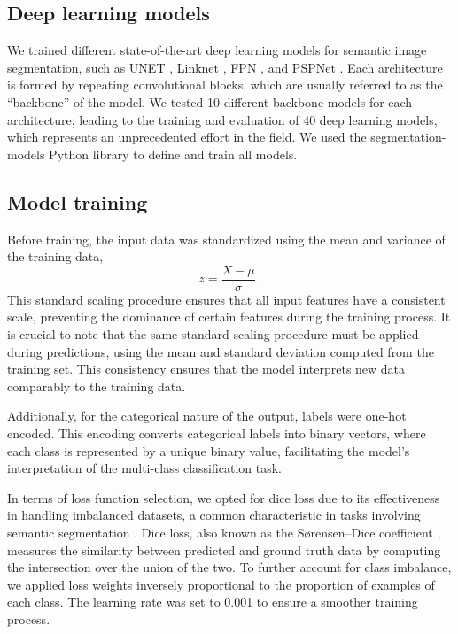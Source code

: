 \subsection{Deep learning models}

We trained different state-of-the-art deep learning models for semantic image
segmentation, such as UNET \cite{Ronneberger2015}, Linknet
\cite{Chaurasia2017}, FPN \cite{Lin2017}, and PSPNet \cite{Zhao2017}. Each
architecture is formed by repeating convolutional blocks, which are usually
referred to as the ``backbone'' of the model. We tested 10 different backbone
models for each architecture, leading to the training and evaluation of 40 deep
learning models, which represents an unprecedented effort in the field. We
used the segmentation-models Python library \cite{segmentation_models} to
define and train all models.

\subsection{Model training}

Before training, the input data was standardized using the mean and variance of
the training data,
\begin{equation}
    z=\frac{X-\mu}{\sigma} \ .
\end{equation}
This standard scaling procedure ensures that all input features have a
consistent scale, preventing the dominance of certain features during the
training process. It is crucial to note that the same standard scaling
procedure must be applied during predictions, using the mean and standard
deviation computed from the training set. This consistency ensures that the
model interprets new data comparably to the training data.

Additionally, for the categorical nature of the output, labels were one-hot
encoded. This encoding converts categorical labels into binary vectors, where
each class is represented by a unique binary value, facilitating the model's
interpretation of the multi-class classification task.

In terms of loss function selection, we opted for dice loss due to its
effectiveness in handling imbalanced datasets, a common characteristic in tasks
involving semantic segmentation \cite{rahman2016optimizing}. Dice loss, also
known as the Sørensen–Dice coefficient \cite{sorensen1948method,
    dice1945measures}, measures the similarity between predicted and ground
truth data by computing the intersection over the union of the two. To further
account for class imbalance, we applied loss weights inversely proportional to
the proportion of examples of each class. The learning rate was set to 0.001 to
ensure a smoother training process.

